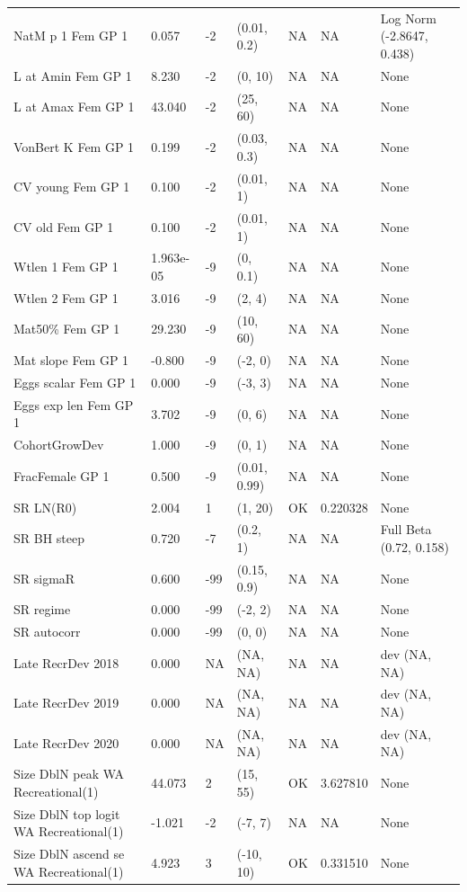 \documentclass[11pt,
  english,
  letterpaper,
]{article}
\begin{document}
\begin{landscape}
\begin{longtable}[t]{>{\raggedright\arraybackslash}p{6cm}lllll>{\raggedright\arraybackslash}p{4cm}}
\endfoot
\bottomrule
\endlastfoot
NatM p 1 Fem GP 1 & 0.057 & -2 & (0.01, 0.2) & NA & NA & Log Norm (-2.8647, 0.438)\\
L at Amin Fem GP 1 & 8.230 & -2 & (0, 10) & NA & NA & None\\
L at Amax Fem GP 1 & 43.040 & -2 & (25, 60) & NA & NA & None\\
VonBert K Fem GP 1 & 0.199 & -2 & (0.03, 0.3) & NA & NA & None\\
CV young Fem GP 1 & 0.100 & -2 & (0.01, 1) & NA & NA & None\\
CV old Fem GP 1 & 0.100 & -2 & (0.01, 1) & NA & NA & None\\
Wtlen 1 Fem GP 1 & 1.963e-05 & -9 & (0, 0.1) & NA & NA & None\\
Wtlen 2 Fem GP 1 & 3.016 & -9 & (2, 4) & NA & NA & None\\
Mat50\% Fem GP 1 & 29.230 & -9 & (10, 60) & NA & NA & None\\
Mat slope Fem GP 1 & -0.800 & -9 & (-2, 0) & NA & NA & None\\
Eggs scalar Fem GP 1 & 0.000 & -9 & (-3, 3) & NA & NA & None\\
Eggs exp len Fem GP 1 & 3.702 & -9 & (0, 6) & NA & NA & None\\
CohortGrowDev & 1.000 & -9 & (0, 1) & NA & NA & None\\
FracFemale GP 1 & 0.500 & -9 & (0.01, 0.99) & NA & NA & None\\
SR LN(R0) & 2.004 & 1 & (1, 20) & OK & 0.220328 & None\\
SR BH steep & 0.720 & -7 & (0.2, 1) & NA & NA & Full Beta (0.72, 0.158)\\
SR sigmaR & 0.600 & -99 & (0.15, 0.9) & NA & NA & None\\
SR regime & 0.000 & -99 & (-2, 2) & NA & NA & None\\
SR autocorr & 0.000 & -99 & (0, 0) & NA & NA & None\\
Late RecrDev 2018 & 0.000 & NA & (NA, NA) & NA & NA & dev (NA, NA)\\
Late RecrDev 2019 & 0.000 & NA & (NA, NA) & NA & NA & dev (NA, NA)\\
Late RecrDev 2020 & 0.000 & NA & (NA, NA) & NA & NA & dev (NA, NA)\\
Size DblN peak WA Recreational(1) & 44.073 & 2 & (15, 55) & OK & 3.627810 & None\\
Size DblN top logit WA Recreational(1) & -1.021 & -2 & (-7, 7) & NA & NA & None\\
Size DblN ascend se WA Recreational(1) & 4.923 & 3 & (-10, 10) & OK & 0.331510 & None\\

\end{longtable}
\end{landscape}
\end{document}
